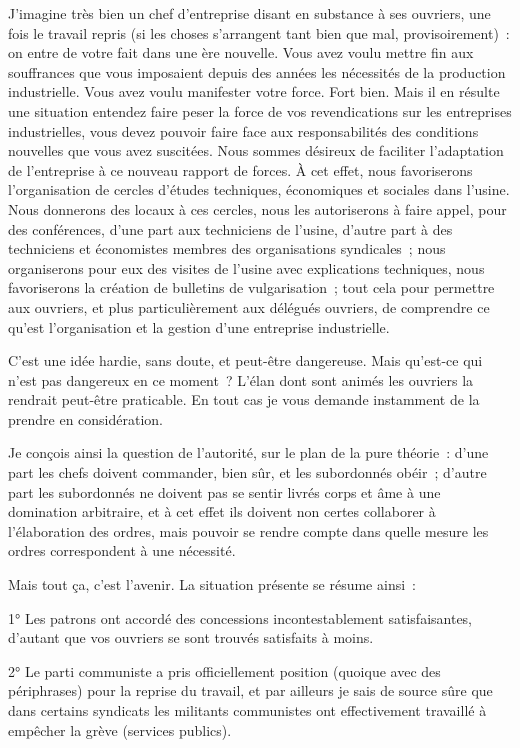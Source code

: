 \documentclass[french,twoside]{book} %
\begin{document}
J'imagine très bien un chef d'entreprise disant en substance à ses ouvriers, une fois le travail repris (si les choses s'arrangent tant bien que mal, provisoirement) : on entre de votre fait dans une ère nouvelle. Vous avez voulu mettre fin aux souffrances que vous imposaient depuis des années les nécessités de la production industrielle. Vous avez voulu manifester votre force. Fort bien. Mais il en résulte une situation entendez faire peser la force de vos revendications sur les entreprises industrielles, vous devez pouvoir faire face aux responsabilités des conditions nouvelles que vous avez suscitées. Nous sommes désireux de faciliter l'adaptation de l'entreprise à ce nouveau rapport de forces. À cet effet, nous favoriserons l'organisation de cercles d'études techniques, économiques et sociales dans l'usine. Nous donnerons des locaux à ces cercles, nous les autoriserons à faire appel, pour des conférences, d'une part aux techniciens de l'usine, d'autre part à des techniciens et économistes membres des organisations syndicales ; nous organiserons pour eux des visites de l'usine avec explications techniques, nous favoriserons la création de bulletins de vulgarisation ; tout cela pour permettre aux ouvriers, et plus particulièrement aux délégués ouvriers, de comprendre ce qu'est l'organisation et la gestion d'une entreprise industrielle.\par
C'est une idée hardie, sans doute, et peut-être dangereuse. Mais qu'est-ce qui n'est pas dangereux en ce moment ? L'élan dont sont animés les ouvriers la rendrait peut-être praticable. En tout cas je vous demande instamment de la prendre en considération.\par
Je conçois ainsi la question de l'autorité, sur le plan de la pure théorie : d'une part les chefs doivent commander, bien sûr, et les subordonnés obéir ; d'autre part les subordonnés ne doivent pas se sentir livrés corps et âme à une domination arbitraire, et à cet effet ils doivent non certes collaborer à l'élaboration des ordres, mais pouvoir se rendre compte dans quelle mesure les ordres correspondent à une nécessité.\par
Mais tout ça, c'est l'avenir. La situation présente se résume ainsi :\par
1° Les patrons ont accordé des concessions incontestablement satisfaisantes, d'autant que vos ouvriers se sont trouvés satisfaits à moins.\par
2° Le parti communiste a pris officiellement position (quoique avec des périphrases) pour la reprise du travail, et par ailleurs je sais de source sûre que dans certains syndicats les militants communistes ont effectivement travaillé à empêcher la grève (services publics).\par
\end{document}
